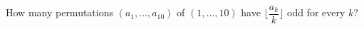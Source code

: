 How many permutations $(a_1,\ldots,a_{10})$ of $(1,\ldots,10)$ have $\lfloor \dfrac{a_k}{k} \rfloor$ odd for every $k$?
